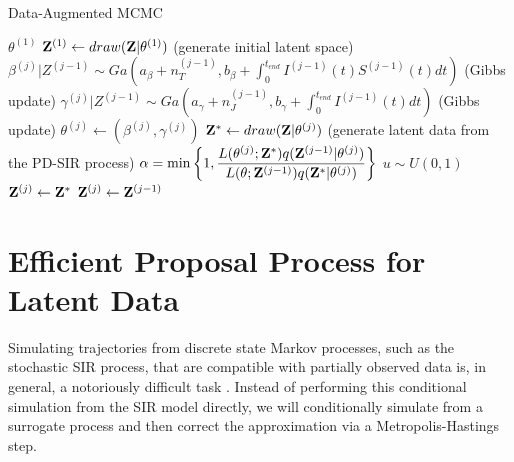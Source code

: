\documentclass[11pt]{article}
\begin{document}
		\begin{algorithm}
		\caption{Data-Augmented MCMC}
		\label{alg:DA-MCMC}
		\begin{algorithmic}
			\REQUIRE $\theta^{(1)}$
			\STATE $\mathbf{Z}^{(1)} \leftarrow draw(\mathbf{Z}|\theta^{(1)})$ (generate initial latent space)
			\STATE $\beta^{(j)}|Z^{(j - 1)} \sim Ga\left( a_{\beta} + n_T^{(j - 1)}, b_{\beta} + \int_{0}^{t_{end}} I^{(j - 1)}(t)S^{(j - 1)}(t)dt\right)$ (Gibbs update)
			\STATE $\gamma^{(j)}|Z^{(j-1)} \sim Ga\left( a_{\gamma} + n_J^{(j - 1)}, b_{\gamma} + \int_{0}^{t_{end}} I^{(j - 1)}(t) dt\right)$ (Gibbs update)
			\STATE $\theta^{(j)} \leftarrow (\beta^{(j)}, \gamma^{(j)})$
			\STATE $\mathbf{Z}^* \leftarrow draw(\mathbf{Z}|\theta^{(j)})$ (generate latent data from the PD-SIR process)
			\STATE $\alpha = \min\left\lbrace 1, \dfrac{L(\theta^{(j)}; \mathbf{Z}^*)q(\mathbf{Z}^{(j - 1)}|\theta^{(j)})}{L(\theta; \mathbf{Z}^{(j - 1)})q(\mathbf{Z}^*|\theta^{(j)})}\right\rbrace  $
			\STATE $u \sim U(0,1)$
			\STATE $\mathbf{Z}^{(j)} \leftarrow \mathbf{Z}^*$					
			\ELSE
			\STATE $\mathbf{Z}^{(j)} \leftarrow \mathbf{Z}^{(j - 1)}$				
			\ENDIF
			\ENDFOR
		\end{algorithmic}
	\end{algorithm}
	
	\section{Efficient Proposal Process for Latent Data}
	Simulating trajectories from discrete state Markov processes, such as the stochastic SIR process, that are compatible with partially observed data is, in general, a notoriously difficult task \cite{Hobolth.2009}. Instead of performing this conditional simulation from the SIR model directly, we will conditionally simulate from a surrogate process and then correct the approximation via a Metropolis-Hastings step.
		
\end{document}
